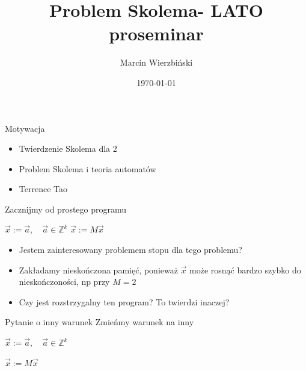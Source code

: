 \documentclass{beamer}
\title{Problem Skolema- LATO proseminar}
\author{Marcin Wierzbiński}
\institute{MIMUW}
\date{\today}
\def\Z{\mathbb Z}
\theoremstyle{definition}
\begin{document}
\frame{\titlepage}

\begin{frame}{Motywacja}
\begin{itemize}
    \item Twierdzenie Skolema dla  $2$
    \item Problem Skolema i teoria automatów
    \item Terrence Tao
\end{itemize}
\end{frame}

\begin{frame}{Zacznijmy od prostego programu}
    \begin{algorithm}[H] 
        \begin{algorithmic}[l]
        \State $\vec{x} := \vec{a}, \quad \vec{a} \in \Z^{k}$  
          \State $\vec{x} := M \vec{x}$ \algorithmiccomment{M \in \Z^{k \times k}}
          
        \EndWhile
        \end{algorithmic}
    \end{algorithm}
    
    \begin{itemize}
    \pause 
    \item Jestem zainteresowany problemem stopu dla tego problemu? 
    
    
    \item  Zakładamy nieskończona pamięć, ponieważ $\vec{x}$ może rosnąć bardzo szybko do nieskończoności, np przy $M=2$
    \pause
    
    \item  Czy jest rozstrzygalny ten program? To twierdzi inaczej?
    \end{itemize}

\end{frame}

\begin{frame}{Pytanie o inny warunek}
    Zmieńmy warunek na inny 
    \begin{algorithm}[H] 
        \begin{algorithmic}[l]
        \State $\vec{x} := \vec{a},  \quad \vec{a} \in \Z^{k}$  

          \State $\vec{x} := M \vec{x}$ \algorithmiccomment{M \in \Z^{k \times k}}
          
        \EndWhile
        \end{algorithmic}
    \end{algorithm}
\end{frame}    
\end{document}
